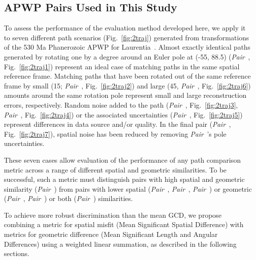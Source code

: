 \subsection{APWP Pairs Used in This Study}

To assess the performance of the evaluation method developed here, we apply it
to seven different path scenarios (Fig.~\ref{fig:2traj}) generated from
transformations of the 530 Ma Phanerozoic APWP for
Laurentia~\cite{T12}. Almost exactly identical paths generated by rotating one
by a degree around an Euler pole at (-55\degree, 88.5\degree)
(\emph{Pair}~\textbf{}, Fig.~\ref{fig:2traj1}) represent an
ideal case of matching paths in the same spatial reference frame. Matching paths
that have been rotated out of the same reference frame by small (15\degree;
\emph{Pair}~\textbf{}, Fig.~\ref{fig:2traj2}) and large
(45\degree, \emph{Pair}~\textbf{}, Fig.~\ref{fig:2traj6})
amounts around the same rotation pole represent small and large reconstruction
errors, respectively. Random noise added to the path
(\emph{Pair}~\textbf{}, Fig.~\ref{fig:2traj3},
\emph{Pair}~\textbf{}, Fig.~\ref{fig:2traj4}) or the
associated uncertainties (\emph{Pair}~\textbf{},
Fig.~\ref{fig:2traj5}) represent differences in data source and/or quality. In
the final pair (\emph{Pair}~\textbf{},
Fig.~\ref{fig:2traj7}), spatial noise has been reduced by removing
\emph{Pair}~\textbf{}'s pole uncertainties.

These seven cases allow evaluation of the performance of any path comparison
metric across a range of different spatial and geometric similarities. To be
successful, such a metric must distinguish pairs with high spatial and geometric
similarity (\emph{Pair}~\textbf{}) from pairs with lower
spatial (\emph{Pair}~\textbf{},
\emph{Pair}~\textbf{},
\emph{Pair}~\textbf{})
or geometric (\emph{Pair}~\textbf{},
\emph{Pair}~\textbf{}) or both
(\emph{Pair}~\textbf{}) similarities.

To achieve more robust discrimination than the mean GCD, we propose combining a
metric for spatial misfit (Mean Significant Spatial Difference) with metrics for
geometric difference (Mean Significant Length and Angular Differences) using a
weighted linear summation, as described in the following sections.

